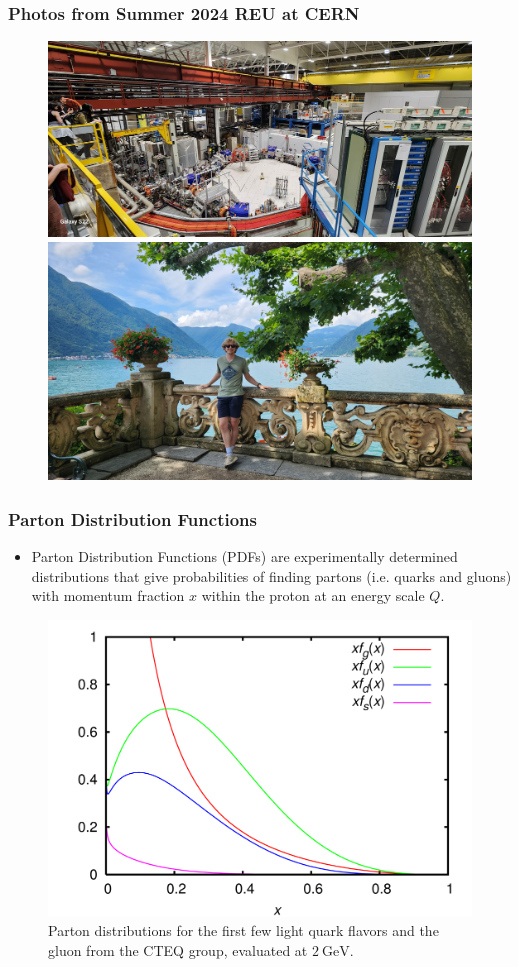\documentclass{beamer}
\begin{document}
\begin{frame}
  \frametitle{Photos from Summer 2024 REU at CERN}

  \begin{figure}
    \centering
    \includegraphics[width=0.6\linewidth]{./gfx/cern/3.jpg}
    \includegraphics[width=0.6\linewidth]{./gfx/cern/4.jpg}
  \end{figure}
  
\end{frame}


\begin{frame}
\frametitle{Parton Distribution Functions}

\begin{itemize}
\item Parton Distribution Functions (PDFs) are experimentally determined distributions that give probabilities of finding partons (i.e. quarks and gluons) with momentum fraction $x$ within the proton at an energy scale $Q$.
\end{itemize}

\begin{figure}
  \centering
  \includegraphics[width=0.4\linewidth]{./gfx/pdfs.png}
  \caption{Parton distributions for the first few light quark flavors and the gluon from the CTEQ group, evaluated at $\qty{2}{\giga\electronvolt}$.}
  \label{fig:pdfs}
\end{figure}

\end{frame}
\end{document}
